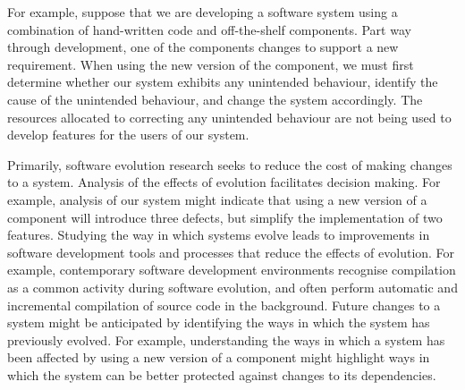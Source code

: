 For example, suppose that we are developing a software system using a combination of hand-written code and off-the-shelf components. Part way through development, one of the components changes to support a new requirement. When using the new version of the component, we must first determine whether our system exhibits any unintended behaviour, identify the cause of the unintended behaviour, and change the system accordingly. The resources allocated to correcting any unintended behaviour are not being used to develop features for the users of our system.

Primarily, software evolution research seeks to reduce the cost of making changes to a system. Analysis of the effects of evolution facilitates decision making. For example, analysis of our system might indicate that using a new version of a component will introduce three defects, but simplify the implementation of two features. Studying the way in which systems evolve leads to improvements in software development tools and processes that reduce the effects of evolution. For example, contemporary software development environments recognise compilation as a common activity during software evolution, and often perform automatic and incremental compilation of source code in the background. Future changes to a system might be anticipated by identifying the ways in which the system has previously evolved. For example, understanding the ways in which a system has been affected by using a new version of a component might highlight ways in which the system can be better protected against changes to its dependencies.